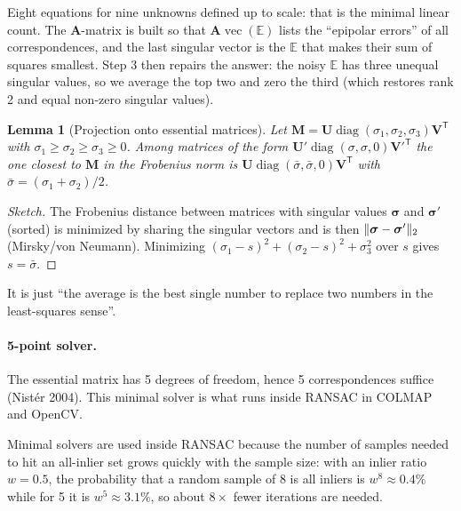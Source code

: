 \documentclass[11pt,a4paper]{article}
\newcommand{\E}{\mathbb{E}}
\newcommand{\tr}{^{\mathsf T}}
\DeclareMathOperator{\diag}{diag}
\DeclareMathOperator{\vecop}{vec}
\theoremstyle{definition}
\theoremstyle{plain}
\newtheorem{lemma}[definition]{Lemma}
\theoremstyle{remark}
\begin{document}
\begin{intuition}
Eight equations for nine unknowns defined up to scale: that is the minimal linear count. The $\bm A$-matrix is built so that $\bm A\vecop(\E)$ lists the ``epipolar errors'' of all correspondences, and the last singular vector is the $\E$ that makes their sum of squares smallest.
Step 3 then repairs the answer: the noisy $\E$ has three unequal singular values, so we average the top two and zero the third (which restores rank 2 and equal non-zero singular values).
\end{intuition}

\begin{lemma}[Projection onto essential matrices]\label{lem:eproj}
Let $\bm M=\bm U\diag(\sigma_1,\sigma_2,\sigma_3)\bm V\tr$ with $\sigma_1\ge\sigma_2\ge\sigma_3\ge0$. Among matrices of the form $\bm U'\diag(\sigma,\sigma,0){\bm V'}\tr$ the one closest to $\bm M$ in the Frobenius norm is $\bm U\diag(\bar\sigma,\bar\sigma,0)\bm V\tr$ with $\bar\sigma=(\sigma_1+\sigma_2)/2$.
\end{lemma}
\begin{proof}[Sketch]
The Frobenius distance between matrices with singular values $\bm\sigma$ and $\bm\sigma'$ (sorted) is minimized by sharing the singular vectors and is then $\lVert \bm\sigma-\bm\sigma'\rVert_2$ (Mirsky/von Neumann).
Minimizing $(\sigma_1-s)^2+(\sigma_2-s)^2+\sigma_3^2$ over $s$ gives $s=\bar\sigma$.
\end{proof}

\begin{intuition}
It is just ``the average is the best single number to replace two numbers in the least-squares sense''.
\end{intuition}

\paragraph{5-point solver.} The essential matrix has 5 degrees of freedom, hence 5 correspondences suffice (Nist\'er 2004). This minimal solver is what runs inside RANSAC in COLMAP and OpenCV.

\begin{beyond}
Minimal solvers are used inside RANSAC because the number of samples needed to hit an all-inlier set grows quickly with the sample size: with an inlier ratio $w=0.5$, the probability that a random sample of 8 is all inliers is $w^8\approx0.4\%$ while for 5 it is $w^5\approx3.1\%$, so about $8\times$ fewer iterations are needed.
\end{beyond}
\end{document}
